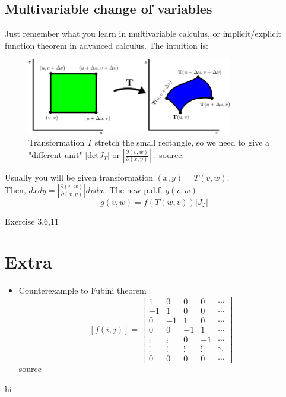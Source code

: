 \subsection{Multivariable change of variables}
Just remember what you learn in multivariable calculus, or implicit/explicit function theorem in advanced calculus. 
The intuition is: 
\begin{figure}[h]
    \centering
    \includegraphics[width=0.8\textwidth]{./Figures/CoV.png}
    \caption{Transformation \(T\) stretch the small rectangle, so we need to give a "different unit"  \(|\text{det}J_T|\) or \(\left|\frac{\partial (v,w)}{\partial (x,y)} \right|\) . \href{https://mathinsight.org/image/change_variable_area_transformation}{source}. }
\end{figure}

Usually you will be given transformation  \((x,y) = T(v,w) \).\\  
Then, $dxdy = \left|\frac{\partial (v,w)}{\partial (x,y)} \right| dvdw $. 
The new p.d.f. \(g(v,w) \) 
\[
    g(v,w) = f(T(w,v)) \left| J_T \right|
\]  
\begin{exercise}
    Exercise 3,6,11
\end{exercise}

\section*{Extra}
\begin{itemize}
    \item Counterexample to Fubini theorem \\ 
    \[
        [f(i,j)]=\begin{bmatrix}1&0&0&0&\cdots
\\ -1&1&0&0&\cdots
\\0&-1&1&0&\cdots
\\0&0&-1&1&\cdots
\\\vdots&\vdots&0&-1&\cdots
\\\vdots&\vdots&\vdots&\vdots&\ddots
\\0&0&0&0&\cdots
\end{bmatrix}
    \] 
    \href{https://math.stackexchange.com/questions/3566631/counterexample-in-fubinis-theorem-non-integrable-function}{source}
\end{itemize}
hi